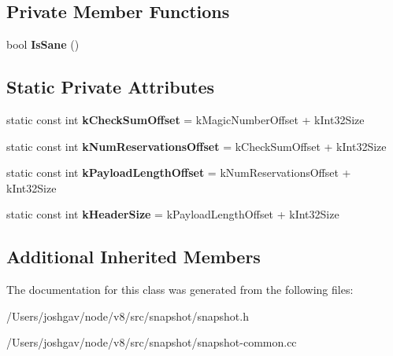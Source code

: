 \subsection*{Private Member Functions}
\begin{DoxyCompactItemize}
\item 
bool {\bfseries Is\+Sane} ()\hypertarget{classv8_1_1internal_1_1_snapshot_data_a890875a26e48e5dbddddf130231d2ce7}{}\label{classv8_1_1internal_1_1_snapshot_data_a890875a26e48e5dbddddf130231d2ce7}

\end{DoxyCompactItemize}
\subsection*{Static Private Attributes}
\begin{DoxyCompactItemize}
\item 
static const int {\bfseries k\+Check\+Sum\+Offset} = k\+Magic\+Number\+Offset + k\+Int32\+Size\hypertarget{classv8_1_1internal_1_1_snapshot_data_a06711fb0f941fa74cd5251c75589287d}{}\label{classv8_1_1internal_1_1_snapshot_data_a06711fb0f941fa74cd5251c75589287d}

\item 
static const int {\bfseries k\+Num\+Reservations\+Offset} = k\+Check\+Sum\+Offset + k\+Int32\+Size\hypertarget{classv8_1_1internal_1_1_snapshot_data_a91562243b3bc3e61ec790606b099f261}{}\label{classv8_1_1internal_1_1_snapshot_data_a91562243b3bc3e61ec790606b099f261}

\item 
static const int {\bfseries k\+Payload\+Length\+Offset} = k\+Num\+Reservations\+Offset + k\+Int32\+Size\hypertarget{classv8_1_1internal_1_1_snapshot_data_a7fa1ebb556a56fc1d24631bd45cead4a}{}\label{classv8_1_1internal_1_1_snapshot_data_a7fa1ebb556a56fc1d24631bd45cead4a}

\item 
static const int {\bfseries k\+Header\+Size} = k\+Payload\+Length\+Offset + k\+Int32\+Size\hypertarget{classv8_1_1internal_1_1_snapshot_data_a433102ef9e64bd495f35a7a27a229513}{}\label{classv8_1_1internal_1_1_snapshot_data_a433102ef9e64bd495f35a7a27a229513}

\end{DoxyCompactItemize}
\subsection*{Additional Inherited Members}


The documentation for this class was generated from the following files\+:\begin{DoxyCompactItemize}
\item 
/\+Users/joshgav/node/v8/src/snapshot/snapshot.\+h\item 
/\+Users/joshgav/node/v8/src/snapshot/snapshot-\/common.\+cc\end{DoxyCompactItemize}
